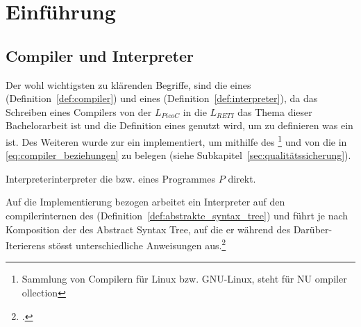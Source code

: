 
\chapter{Einführung}
\label{ch:einführung}

\section{Compiler und Interpreter}
Der wohl wichtigsten zu klärenden Begriffe, sind die eines  (Definition~\ref{def:compiler}) und eines   (Definition~\ref{def:interpreter}), da das Schreiben eines Compilers von der  $L_{PicoC}$ in die  $L_{RETI}$ das Thema dieser Bachelorarbeit ist und die Definition eines  genutzt wird, um zu definieren was ein  ist. Des Weiteren wurde zur  ein  implementiert, um mithilfe des \footnote{Sammlung von Compilern für Linux bzw. GNU-Linux, steht für NU ompiler ollection} und von  die  in \ref{eq:compiler_beziehungen} zu belegen (siehe Subkapitel~\ref{sec:qualitätssicherung}).

\begin{Definition}{Interpreter}{interpreter}
   die  bzw.  eines Programmes $P$ direkt.

  Auf die Implementierung bezogen arbeitet ein Interpreter auf den compilerinternen  des  (Definition~\ref{def:abstrakte_syntax_tree}) und führt je nach Komposition der  des Abstract Syntax Tree, auf die er während des Darüber-Iterierens stösst unterschiedliche Anweisungen aus.\footcite{g_siek_course_2022}
\end{Definition}

